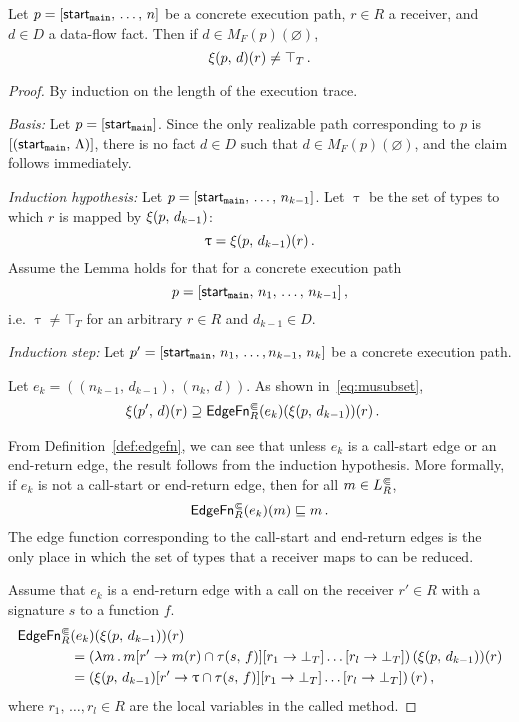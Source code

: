 \begin{lemma}\label{lem:sound3}
  Let $p=[\textsf{start}_\texttt{main},\,\dots,\,n]$ be a concrete execution path, $r\in R$ a receiver, and $d\in D$ a data-flow fact. Then if $d\in M_F(p)(\varnothing)$,
  \begin{equation}
    \xi(p,\,d)(r)\ne\top_T\,.
  \end{equation}
\end{lemma}
\begin{proof}
  By induction on the length of the execution trace.
  
  \textit{Basis:} 
    Let $p=[\textsf{start}_\texttt{main}]$. Since the only realizable path corresponding to $p$ is $[(\textsf{start}_\texttt{main},\,\Lambda)]$, there is no fact $d\in D$ such that $d\in M_F(p)(\varnothing)$, and the claim follows immediately.
  
  \textit{Induction hypothesis:} 
  Let $p=[\textsf{start}_\texttt{main},\,\dots,\,n_{k-1}]$. Let $\uptau$ be the set of types to which $r$ is mapped by $\xi(p,\,d_{k-1})$:
  \begin{equation}
    \uptau=\xi(p,\,d_{k-1})(r)\,.
  \end{equation}
  Assume the Lemma holds for that for a concrete execution path $$p=[\textsf{start}_\texttt{main},\,n_1,\,\dots,\,n_{k-1}]\,,$$ i.e. $\uptau\ne\top_T$ for an arbitrary $r\in R$ and $d_{k-1}\in D$.
  
  \textit{Induction step:}
    Let $p'=[\textsf{start}_\texttt{main},\,n_1,\,\dots,n_{k-1},\,n_k]$ be a concrete execution path.
    
    Let $e_k=((n_{k-1},\,d_{k-1}),\,(n_k,\,d))$. As shown in~\eqref{eq:musubset},
    \begin{align*}
      \xi(p',\,d)(r)
        &\supseteq\textsf{EdgeFn}^\Subset_{R}(e_k)(\xi(p,\,d_{k-1}))(r)\,.
    \end{align*}

    From Definition~\ref{def:edgefn}, we can see that unless $e_k$ is a call-start edge or an end-return edge, the result follows from the induction hypothesis.
    More formally, if $e_k$ is not a call-start or end-return edge, then for all $m\in L^\Subset_R$,
    \[
      \textsf{EdgeFn}^\Subset_{R}(e_k)(m)\sqsubseteq m\,.
    \]
     The edge function corresponding to the call-start and end-return edges is the only place in which the set of types that a receiver maps to can be reduced.
    
    Assume that $e_k$ is a end-return edge with a call on the receiver $r'\in R$ with a signature $s$ to a function $f$.
    \begin{align*}
      \textsf{EdgeFn}^\Subset_{R}&(e_k)(\xi(p,\,d_{k-1}))(r)\\
      &=\left(\lambda m\,.\,m[r'\to m(r)\cap\tau(s,\,f)][r_1\to\bot_T]\dots[r_l\to\bot_T]\right)(\xi(p,\,d_{k-1}))(r)\\
      &=\left(\xi(p,\,d_{k-1})[r'\to \uptau\cap\tau(s,\,f)][r_1\to\bot_T]\dots[r_l\to\bot_T]\right)(r)\,,
    \end{align*}
  where $r_1,\,\dots,r_l\in R$ are the local variables in the called method.
    

\end{proof}

